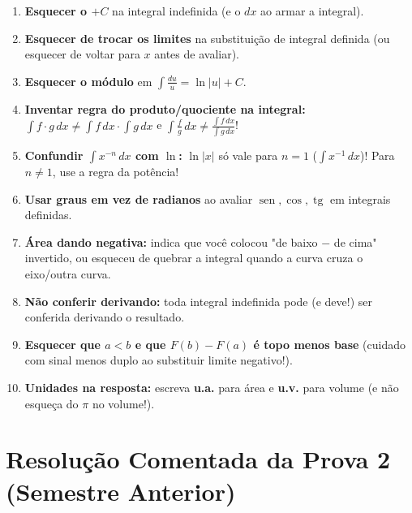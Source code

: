 \documentclass[10pt,a4paper]{article}
\DeclareMathOperator{\sen}{sen}
\DeclareMathOperator{\tg}{tg}
\newif\ifresolucao
\begin{document}
\begin{cuidado}
    \begin{enumerate}
        \item \textbf{Esquecer o $+C$} na integral indefinida (e o $dx$ ao armar a integral).
        \item \textbf{Esquecer de trocar os limites} na substituição de integral definida (ou esquecer de voltar para $x$ antes de avaliar).
        \item \textbf{Esquecer o módulo} em $\int \frac{du}{u} = \ln|u| + C$.
        \item \textbf{Inventar regra do produto/quociente na integral:} $\int f \cdot g \, dx \neq \int f \, dx \cdot \int g \, dx$ e $\int \frac{f}{g}\,dx \neq \frac{\int f\,dx}{\int g\,dx}$!
        \item \textbf{Confundir $\int x^{-n}\,dx$ com $\ln$:} $\ln|x|$ só vale para $n=1$ ($\int x^{-1}\,dx$)! Para $n \neq 1$, use a regra da potência!
        \item \textbf{Usar graus em vez de radianos} ao avaliar $\sen, \cos, \tg$ em integrais definidas.
        \item \textbf{Área dando negativa:} indica que você colocou "de baixo $-$ de cima" invertido, ou esqueceu de quebrar a integral quando a curva cruza o eixo/outra curva.
        \item \textbf{Não conferir derivando:} toda integral indefinida pode (e deve!) ser conferida derivando o resultado.
        \item \textbf{Esquecer que $a < b$ e que $F(b) - F(a)$ é topo menos base} (cuidado com sinal menos duplo ao substituir limite negativo!).
        \item \textbf{Unidades na resposta:} escreva \textbf{u.a.} para área e \textbf{u.v.} para volume (e não esqueça do $\pi$ no volume!).
    \end{enumerate}
\end{cuidado}

\ifresolucao
\clearpage
\section*{Resolução Comentada da Prova 2 (Semestre Anterior)}
\end{document}
